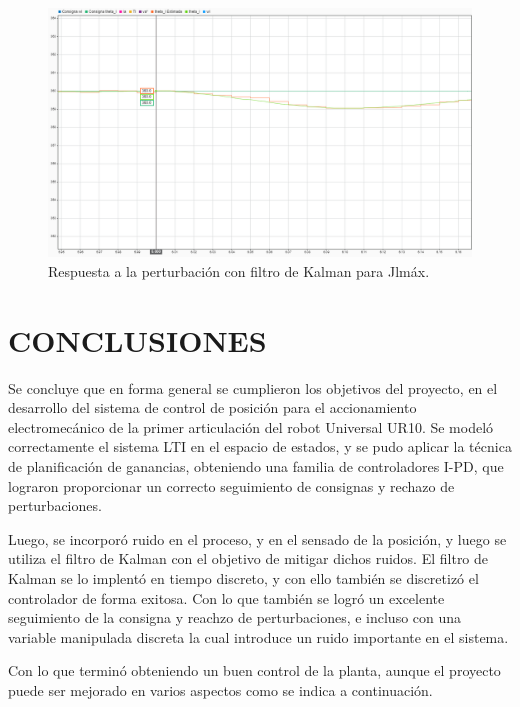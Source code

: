 \documentclass{article}
\begin{document}
\begin{sloppypar}
\begin{figure}[H]
    \centering
    \includegraphics[width=1\textwidth]{Respuesta a la perturbación con filtro de Kalman para Jlmáx}
    \caption{Respuesta a la perturbación con filtro de Kalman para Jlmáx.}
    \label{fig:Respuesta a la perturbación con filtro de Kalman para Jlmáx}
\end{figure}

\section{CONCLUSIONES}
\label{sec:CONCLUSIONES}

Se concluye que en forma general se cumplieron los objetivos del proyecto, en el desarrollo del sistema de control de posición para el accionamiento electromecánico de la primer articulación del robot Universal UR10. Se modeló correctamente el sistema LTI en el espacio de estados, y se pudo aplicar la técnica de planificación de ganancias, obteniendo una familia de controladores I-PD, que lograron proporcionar un correcto seguimiento de consignas y rechazo de perturbaciones.

Luego, se incorporó ruido en el proceso, y en el sensado de la posición, y luego se utiliza el filtro de Kalman con el objetivo de mitigar dichos ruidos. El filtro de Kalman se lo implentó en tiempo discreto, y con ello también se discretizó el controlador de forma exitosa. Con lo que también se logró un excelente seguimiento de la consigna y reachzo de perturbaciones, e incluso con una variable manipulada discreta la cual introduce un ruido importante en el sistema.

Con lo que terminó obteniendo un buen control de la planta, aunque el proyecto puede ser mejorado en varios aspectos como se indica a continuación.


\end{sloppypar}
\end{document}
